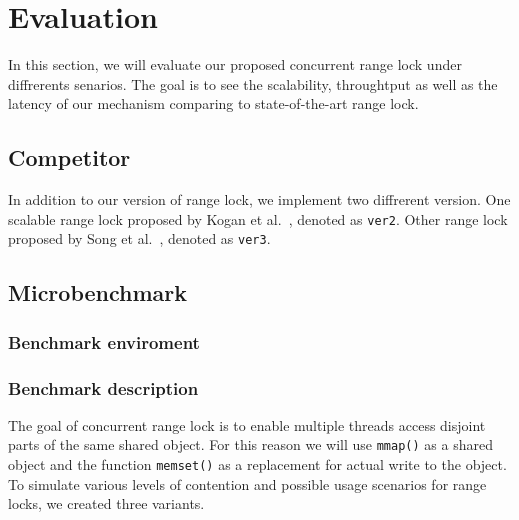 \chapter{Evaluation}\label{chapter:evaluation}

In this section, we will evaluate our proposed concurrent range lock under diffrerents senarios. The goal is to see the scalability, throughtput as well as the latency of our mechanism comparing to state-of-the-art range lock.

\section{Competitor}

In addition to our version of range lock, we implement two diffrerent version. One scalable range lock proposed by Kogan et al.~\parencite{kogan2020scalable}, denoted as \texttt{ver2}. Other range lock proposed by Song et al.~\parencite{song2013parallelizing}, denoted as \texttt{ver3}.

\section{Microbenchmark}

\subsection{Benchmark enviroment}

\subsection{Benchmark description}

The goal of concurrent range lock is to enable multiple threads access disjoint parts of the same shared object. For this reason we will use \texttt{mmap()} as a shared object and the function \texttt{memset()} as a replacement for actual write to the object. 
To simulate various levels of contention and possible usage scenarios for range locks, we created three variants.

